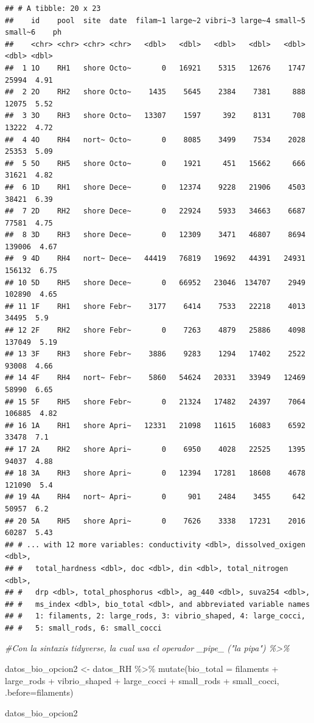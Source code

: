 \documentclass[
]{book}
\newenvironment{Shaded}{\begin{snugshade}}{\end{snugshade}}
\newcommand{\AttributeTok}[1]{\textcolor[rgb]{0.77,0.63,0.00}{#1}}
\newcommand{\CommentTok}[1]{\textcolor[rgb]{0.56,0.35,0.01}{\textit{#1}}}
\newcommand{\FunctionTok}[1]{\textcolor[rgb]{0.00,0.00,0.00}{#1}}
\newcommand{\NormalTok}[1]{#1}
\newcommand{\OtherTok}[1]{\textcolor[rgb]{0.56,0.35,0.01}{#1}}
\newcommand{\SpecialCharTok}[1]{\textcolor[rgb]{0.00,0.00,0.00}{#1}}
\begin{document}
\begin{verbatim}
## # A tibble: 20 x 23
##    id    pool  site  date  filam~1 large~2 vibri~3 large~4 small~5 small~6    ph
##    <chr> <chr> <chr> <chr>   <dbl>   <dbl>   <dbl>   <dbl>   <dbl>   <dbl> <dbl>
##  1 1O    RH1   shore Octo~       0   16921    5315   12676    1747   25994  4.91
##  2 2O    RH2   shore Octo~    1435    5645    2384    7381     888   12075  5.52
##  3 3O    RH3   shore Octo~   13307    1597     392    8131     708   13222  4.72
##  4 4O    RH4   nort~ Octo~       0    8085    3499    7534    2028   25353  5.09
##  5 5O    RH5   shore Octo~       0    1921     451   15662     666   31621  4.82
##  6 1D    RH1   shore Dece~       0   12374    9228   21906    4503   38421  6.39
##  7 2D    RH2   shore Dece~       0   22924    5933   34663    6687   77581  4.75
##  8 3D    RH3   shore Dece~       0   12309    3471   46807    8694  139006  4.67
##  9 4D    RH4   nort~ Dece~   44419   76819   19692   44391   24931  156132  6.75
## 10 5D    RH5   shore Dece~       0   66952   23046  134707    2949  102890  4.65
## 11 1F    RH1   shore Febr~    3177    6414    7533   22218    4013   34495  5.9 
## 12 2F    RH2   shore Febr~       0    7263    4879   25886    4098  137049  5.19
## 13 3F    RH3   shore Febr~    3886    9283    1294   17402    2522   93008  4.66
## 14 4F    RH4   nort~ Febr~    5860   54624   20331   33949   12469   58990  6.65
## 15 5F    RH5   shore Febr~       0   21324   17482   24397    7064  106885  4.82
## 16 1A    RH1   shore Apri~   12331   21098   11615   16083    6592   33478  7.1 
## 17 2A    RH2   shore Apri~       0    6950    4028   22525    1395   94037  4.88
## 18 3A    RH3   shore Apri~       0   12394   17281   18608    4678  121090  5.4 
## 19 4A    RH4   nort~ Apri~       0     901    2484    3455     642   50957  6.2 
## 20 5A    RH5   shore Apri~       0    7626    3338   17231    2016   60287  5.43
## # ... with 12 more variables: conductivity <dbl>, dissolved_oxigen <dbl>,
## #   total_hardness <dbl>, doc <dbl>, din <dbl>, total_nitrogen <dbl>,
## #   drp <dbl>, total_phosphorus <dbl>, ag_440 <dbl>, suva254 <dbl>,
## #   ms_index <dbl>, bio_total <dbl>, and abbreviated variable names
## #   1: filaments, 2: large_rods, 3: vibrio_shaped, 4: large_cocci,
## #   5: small_rods, 6: small_cocci
\end{verbatim}

\begin{Shaded}
\begin{Highlighting}[]
\CommentTok{\#Con la sintaxis tidyverse, la cual usa el operador \_pipe\_ ("la pipa") \%\textgreater{}\%}

\NormalTok{datos\_bio\_opcion2 }\OtherTok{\textless{}{-}}\NormalTok{ datos\_RH }\SpecialCharTok{\%\textgreater{}\%}
  \FunctionTok{mutate}\NormalTok{(}\AttributeTok{bio\_total =}\NormalTok{ filaments }\SpecialCharTok{+}\NormalTok{ large\_rods }\SpecialCharTok{+}\NormalTok{ vibrio\_shaped }\SpecialCharTok{+}\NormalTok{ large\_cocci }\SpecialCharTok{+}\NormalTok{ small\_rods }\SpecialCharTok{+}\NormalTok{ small\_cocci, }\AttributeTok{.before=}\NormalTok{filaments)}

\NormalTok{datos\_bio\_opcion2}
\end{Highlighting}
\end{Shaded}
\end{document}
